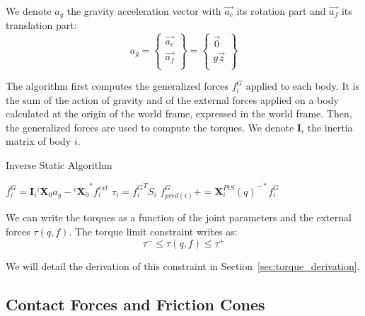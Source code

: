 We denote $a_g$ the gravity acceleration vector with $\vec{a_c}$ its rotation part and $\vec{a_f}$ its translation part:
\begin{equation}
  a_g = \left\{ \begin{array}{r}
    \vec{a_c} \\
    \vec{a_f} \\
  \end{array} \right\}
  = \left\{ \begin{array}{r}
    \vec{0} \\
    g\vec{z}\\
  \end{array} \right\}
\end{equation}

The algorithm first computes the generalized forces $f^G_i$ applied to each body.
It is the sum of the action of gravity and of the external forces applied on a body calculated at the origin of the world frame, expressed in the world frame.
Then, the generalized forces are used to compute the torques.
We denote $\mathbf{I}_i$ the inertia matrix of body $i$.

\begin{algorithm}
  \caption{Inverse Static Algorithm}
\label{alg:IS}
\begin{algorithmic}
  \State$f^G_i = \mathbf{I}_i {}^i\mathbf{X}_0 a_g - {{}^i\mathbf{X}_0}^*f_i^{ext}$
  \EndFor{}
  \State$\tau_i = {f^G_i}^T S_i$
  \State$f^G_{pred(i)} += {\mathbf{X}^{PtS}_i(q)}^{-*} f^G_i$
  \EndIf{}
  \EndFor{}
\end{algorithmic}
\end{algorithm}

We can write the torques as a function of the joint parameters and the external forces $\tau(q,f)$.
The torque limit constraint writes as:
\begin{equation}
  \boxed{\tau^- \leq \tau(q,f) \leq \tau^+}
\end{equation}

We will detail the derivation of this constraint in Section~\ref{sec:torque_derivation}.


\subsection{Contact Forces and Friction Cones}
\label{subsec:contact_forces_and_friction_cones}



